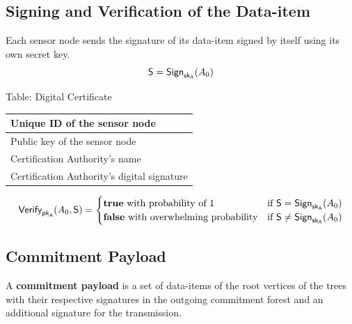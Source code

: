 \documentclass[%
  slidesonly,%
  semlayer%
  ]{seminar}                                  %
\newcommand{\sk}{\sf{sk}}
\newcommand{\pk}{\sf{pk}}
\begin{document}
\begin{slide}
    \subsection*{Signing and Verification of the Data-item}
      \vfill
      Each sensor node sends the signature of its data-item signed by itself using its own secret key. 
      \begin{equation*}
          \textsf{S} = \textsf{Sign}_{\sk_{A}}(A_{0})
        \end{equation*}
        \begin{center}
          Table: Digital Certificate
      \end{center}
      \begin{table} 
        \tiny 
          \centering
          \begin{tabular}{ |l| }
              \hline
              Unique ID of the sensor node \\
              \hline
              Public key of the sensor node \\  
              \hline
              Certification Authority's name \\
              \hline
              Certification Authority's digital signature \\
              \hline
          \end{tabular}
      \end{table}

      \begin{equation*}
        \textsf{Verify}_{\pk_{A}}(A_{0},\textsf{S}) = 
        \begin{cases}
         \textbf{true}\ \mbox{with probability of 1} & \mbox{if}\ \textsf{S} = \textsf{Sign}_{\sk_{A}}(A_{0})\\
         \textbf{false}\ \mbox{with overwhelming probability} & \mbox{if}\ \textsf{S} \neq \textsf{Sign}_{\sk_{A}}(A_{0})
        \end{cases}
      \end{equation*}
      \vfill
      \clearpage

    \subsection*{Commitment Payload}
      \vfill
      A \textbf{commitment payload} is a set of data-items of the root vertices of the trees with their respective signatures in the outgoing commitment forest and an additional signature for the transmission.
    

\end{slide}
\end{document}
